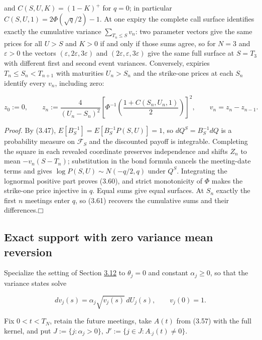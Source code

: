 \documentclass[11pt]{article}
\providecommand{\square}{\mdlgwhtsquare}
\begin{document}
and \(C(S, U, K) = (1 - K)^+\) for \(q = 0\); in particular \(C(S, U, 1) = 2\Phi(\sqrt q / 2) - 1\). At one expiry the complete call surface identifies exactly the cumulative variance \(\sum_{T_n \le S} v_n\): two parameter vectors give the same prices for all \(U > S\) and \(K > 0\) if and only if those sums agree, so for \(N = 3\) and \(\varepsilon > 0\) the vectors \((\varepsilon, 2\varepsilon, 3\varepsilon)\) and \((2\varepsilon, \varepsilon, 3\varepsilon)\) give the same full surface at \(S = T_3\) with different first and second event variances. Conversely, expiries \(T_n \le S_n < T_{n+1}\) with maturities \(U_n > S_n\) and the strike-one prices at each \(S_n\) identify every \(v_n\), including zero:

\begin{equation*}
z_0 := 0, \qquad z_n := \frac{4}{(U_n - S_n)^2} \left[ \Phi^{-1}\left( \frac{1 + C(S_n, U_n, 1)}{2} \right) \right]^2, \qquad v_n = z_n - z_{n-1}. \tag{3.61}\label{eq:3.61}
\end{equation*}

\emph{Proof.} By (3.47), \(E[B_S^{-1}] = E[B_S^{-1} P(S, U)] = 1\), so \(dQ^S = B_S^{-1} dQ\) is a probability measure on \(\mathcal F_S\) and the discounted payoff is integrable. Completing the square in each revealed coordinate preserves independence and shifts \(Z_n\) to mean \(-v_n (S - T_n)\); substitution in the bond formula cancels the meeting-date terms and gives \(\log P(S, U) \sim N(-q/2, q)\) under \(Q^S\). Integrating the lognormal positive part proves (3.60), and strict monotonicity of \(\Phi\) makes the strike-one price injective in \(q\). Equal sums give equal surfaces. At \(S_n\) exactly the first \(n\) meetings enter \(q\), so (3.61) recovers the cumulative sums and their differences.\hfill$\square$

\subsection{Exact support with zero variance mean reversion}\label{sec:3.14}

Specialize the setting of Section \hyperref[sec:3.12]{3.12} to \(\theta_j = 0\) and constant \(\alpha_j \ge 0\), so that the variance states solve

\begin{equation*}
dv_j(s) = \alpha_j \sqrt{v_j(s)}\,dU_j(s), \qquad v_j(0) = 1. \tag{3.62}\label{eq:3.62}
\end{equation*}

Fix \(0 < t < T_N\), retain the future meetings, take \(A(t)\) from (3.57) with the full kernel, and put \(J := \{j : \alpha_j > 0\}\), \(J' := \{j \in J : A_{\cdot j}(t) \ne 0\}\).
\end{document}
